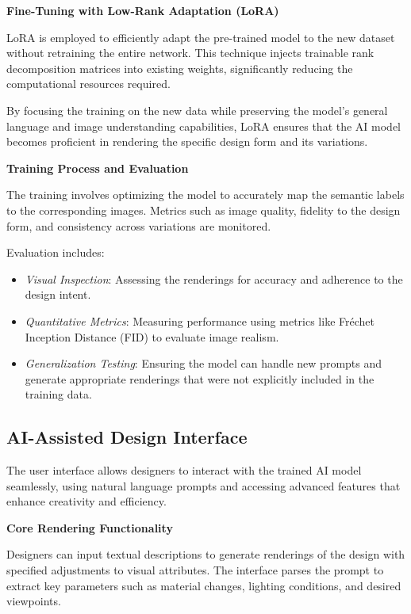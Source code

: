 \documentclass{article}
\begin{document}
\textbf{Fine-Tuning with Low-Rank Adaptation (LoRA)}

LoRA is employed to efficiently adapt the pre-trained model to the new dataset without retraining the entire network. This technique injects trainable rank decomposition matrices into existing weights, significantly reducing the computational resources required.

By focusing the training on the new data while preserving the model's general language and image understanding capabilities, LoRA ensures that the AI model becomes proficient in rendering the specific design form and its variations.

\textbf{Training Process and Evaluation}

The training involves optimizing the model to accurately map the semantic labels to the corresponding images. Metrics such as image quality, fidelity to the design form, and consistency across variations are monitored.

Evaluation includes:

\begin{itemize}
    \item \textit{Visual Inspection}: Assessing the renderings for accuracy and adherence to the design intent.
    \item \textit{Quantitative Metrics}: Measuring performance using metrics like Fréchet Inception Distance (FID) to evaluate image realism.
    \item \textit{Generalization Testing}: Ensuring the model can handle new prompts and generate appropriate renderings that were not explicitly included in the training data.
\end{itemize}

\subsection{AI-Assisted Design Interface}

The user interface allows designers to interact with the trained AI model seamlessly, using natural language prompts and accessing advanced features that enhance creativity and efficiency.

\textbf{Core Rendering Functionality}

Designers can input textual descriptions to generate renderings of the design with specified adjustments to visual attributes. The interface parses the prompt to extract key parameters such as material changes, lighting conditions, and desired viewpoints.
\end{document}
